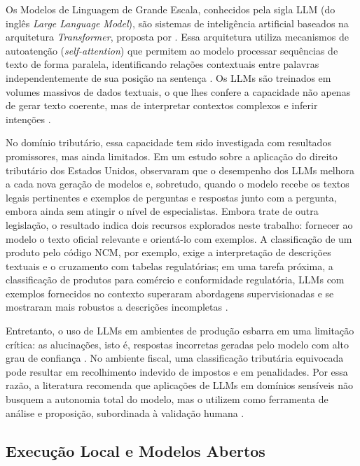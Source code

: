 Os Modelos de Linguagem de Grande Escala, conhecidos pela sigla LLM (do inglês \textit{Large Language Model}), são sistemas de inteligência artificial baseados na arquitetura \textit{Transformer}, proposta por . Essa arquitetura utiliza mecanismos de autoatenção (\textit{self-attention}) que permitem ao modelo processar sequências de texto de forma paralela, identificando relações contextuais entre palavras independentemente de sua posição na sentença \cite{shao2024}. Os LLMs são treinados em volumes massivos de dados textuais, o que lhes confere a capacidade não apenas de gerar texto coerente, mas de interpretar contextos complexos e inferir intenções \cite{douglas2023}.

No domínio tributário, essa capacidade tem sido investigada com resultados promissores, mas ainda limitados. Em um estudo sobre a aplicação do direito tributário dos Estados Unidos,  observaram que o desempenho dos LLMs melhora a cada nova geração de modelos e, sobretudo, quando o modelo recebe os textos legais pertinentes e exemplos de perguntas e respostas junto com a pergunta, embora ainda sem atingir o nível de especialistas. Embora trate de outra legislação, o resultado indica dois recursos explorados neste trabalho: fornecer ao modelo o texto oficial relevante e orientá-lo com exemplos. A classificação de um produto pelo código NCM, por exemplo, exige a interpretação de descrições textuais e o cruzamento com tabelas regulatórias; em uma tarefa próxima, a classificação de produtos para comércio e conformidade regulatória, LLMs com exemplos fornecidos no contexto superaram abordagens supervisionadas e se mostraram mais robustos a descrições incompletas \cite{gholamian2024llmclassification}.

Entretanto, o uso de LLMs em ambientes de produção esbarra em uma limitação crítica: as alucinações, isto é, respostas incorretas geradas pelo modelo com alto grau de confiança \cite{huang2025hallucination}. No ambiente fiscal, uma classificação tributária equivocada pode resultar em recolhimento indevido de impostos e em penalidades. Por essa razão, a literatura recomenda que aplicações de LLMs em domínios sensíveis não busquem a autonomia total do modelo, mas o utilizem como ferramenta de análise e proposição, subordinada à validação humana \cite{Natarajan2024AI2L}.

\subsection{Execução Local e Modelos Abertos}

